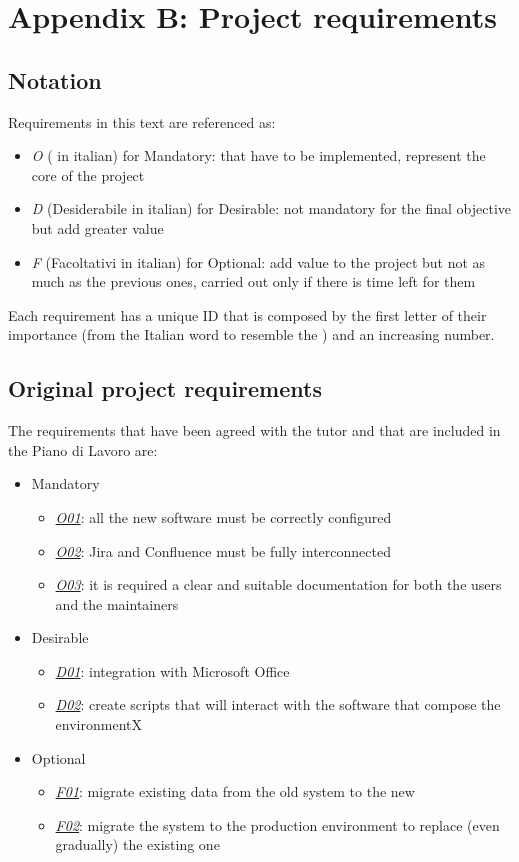 \renewcommand\thechapter{B}
\chapter{Appendix B: Project requirements}
\label{AppendixB}

\section{Notation}
	Requirements in this text are referenced as:
	\begin{itemize}
		\item \textit{O} ( in italian) for Mandatory: that have to be implemented, represent the core of the project
		\item \textit{D} (Desiderabile in italian) for Desirable: not mandatory for the final objective but add greater value
		\item \textit{F} (Facoltativi in italian) for Optional: add value to the project but not as much as the previous ones, carried out only if there is time left for them
	\end{itemize}
	Each requirement has a unique ID that is composed by the first letter of their importance (from the Italian word to resemble the ) and an increasing number.

\newpage
\section{Original project requirements}
	The requirements that have been agreed with the tutor and that are included in the Piano di Lavoro are:
	\begin{itemize}
		\item Mandatory
		\begin{itemize}
			\item \underline{\textit{O01}}: all the new software must be correctly configured
			\item \underline{\textit{O02}}: Jira and Confluence must be fully interconnected
			\item \underline{\textit{O03}}: it is required a clear and suitable documentation for both the users and the maintainers
		\end{itemize}
		\item Desirable
		\begin{itemize}
			\item \underline{\textit{D01}}: integration with Microsoft Office
			\item \underline{\textit{D02}}: create scripts that will interact with the software that compose the environmentX
		\end{itemize}
		\item Optional
		\begin{itemize}
			\item \underline{\textit{F01}}: migrate existing data from the old system to the new
			\item \underline{\textit{F02}}: migrate the system to the production environment to replace (even gradually) the existing one
		\end{itemize} 
	\end{itemize}

